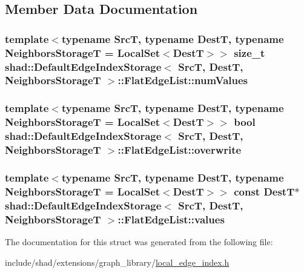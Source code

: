 \subsection{Member Data Documentation}
\hypertarget{structshad_1_1DefaultEdgeIndexStorage_1_1FlatEdgeList_ad805a1579ec182e2ad5878268e3aee7d}{
\subsubsection[{num\-Values}]{\setlength{\rightskip}{0pt plus 5cm}template$<$typename Src\-T, typename Dest\-T, typename Neighbors\-Storage\-T = Local\-Set$<$\-Dest\-T$>$$>$ size\-\_\-t {\bf shad\-::\-Default\-Edge\-Index\-Storage}$<$ Src\-T, Dest\-T, Neighbors\-Storage\-T $>$\-::Flat\-Edge\-List\-::num\-Values}}\label{structshad_1_1DefaultEdgeIndexStorage_1_1FlatEdgeList_ad805a1579ec182e2ad5878268e3aee7d}
\hypertarget{structshad_1_1DefaultEdgeIndexStorage_1_1FlatEdgeList_ac3b2113ea27e01418d7f910bb39f6512}{
\subsubsection[{overwrite}]{\setlength{\rightskip}{0pt plus 5cm}template$<$typename Src\-T, typename Dest\-T, typename Neighbors\-Storage\-T = Local\-Set$<$\-Dest\-T$>$$>$ bool {\bf shad\-::\-Default\-Edge\-Index\-Storage}$<$ Src\-T, Dest\-T, Neighbors\-Storage\-T $>$\-::Flat\-Edge\-List\-::overwrite}}\label{structshad_1_1DefaultEdgeIndexStorage_1_1FlatEdgeList_ac3b2113ea27e01418d7f910bb39f6512}
\hypertarget{structshad_1_1DefaultEdgeIndexStorage_1_1FlatEdgeList_af5d56fe152a408435852906579557af1}{
\subsubsection[{values}]{\setlength{\rightskip}{0pt plus 5cm}template$<$typename Src\-T, typename Dest\-T, typename Neighbors\-Storage\-T = Local\-Set$<$\-Dest\-T$>$$>$ const Dest\-T$\ast$ {\bf shad\-::\-Default\-Edge\-Index\-Storage}$<$ Src\-T, Dest\-T, Neighbors\-Storage\-T $>$\-::Flat\-Edge\-List\-::values}}\label{structshad_1_1DefaultEdgeIndexStorage_1_1FlatEdgeList_af5d56fe152a408435852906579557af1}


The documentation for this struct was generated from the following file\-:\begin{DoxyCompactItemize}
\item 
include/shad/extensions/graph\-\_\-library/\hyperlink{local__edge__index_8h}{local\-\_\-edge\-\_\-index.\-h}\end{DoxyCompactItemize}
